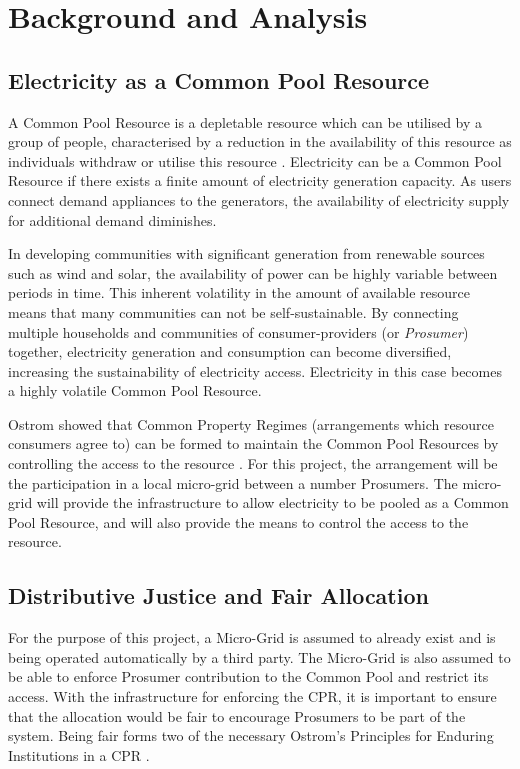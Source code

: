 \chapter{Background and Analysis}
\label{Background}

\section*{Electricity as a Common Pool Resource}
A Common Pool Resource is a depletable resource which can be utilised by a group of people, characterised by a reduction in the availability of this resource as individuals withdraw or utilise this resource \cite{Ostrom:90}.  Electricity can be a Common Pool Resource if there exists a finite amount of electricity generation capacity. As users connect demand appliances to the generators, the availability of electricity supply for additional demand diminishes.

In developing communities with significant generation from renewable sources such as wind and solar, the availability of power can be highly variable between periods in time. This inherent volatility in the amount of available resource means that many communities can not be self-sustainable. By connecting multiple households and communities of consumer-providers (or \textit{Prosumer}) together, electricity generation and consumption can become diversified, increasing the sustainability of electricity access. Electricity in this case becomes a highly volatile Common Pool Resource.

Ostrom showed that Common Property Regimes (arrangements which resource consumers agree to) can be formed to maintain the Common Pool Resources by controlling the access to the resource \cite{Ostrom:90}. For this project, the arrangement will be the participation in a local micro-grid between a number Prosumers. The micro-grid will provide the infrastructure to allow electricity to be pooled as a Common Pool Resource, and will also provide the means to control the access to the resource.

\section*{Distributive Justice and Fair Allocation}
For the purpose of this project, a Micro-Grid is assumed to already exist and is being operated automatically by a third party. The Micro-Grid is also assumed to be able to enforce Prosumer contribution to the Common Pool and restrict its access. With the infrastructure for enforcing the \ac{CPR}, it is important to ensure that the allocation would be fair to encourage Prosumers to be part of the system. Being fair forms two of the necessary Ostrom's Principles for Enduring Institutions in a CPR \cite{Ostrom:90}. \\

